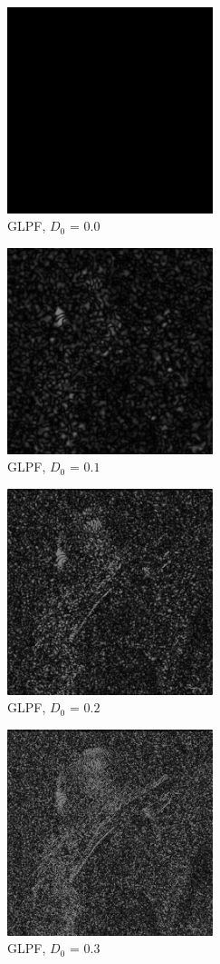 \documentclass[conference]{IEEEtran}
\begin{document}
\begin{figure}[H]
\centerline{\includegraphics[width=6cm]{GLPF0_0.jpg}}
\caption{GLPF, $D_0$ = $0.0$}
\label{GLPF0.0}
\end{figure}

\begin{figure}[H]
\centerline{\includegraphics[width=6cm]{GLPF0_1.jpg}}
\caption{GLPF, $D_0$ = $0.1$}
\label{GLPF0.1}
\end{figure}

\begin{figure}[H]
\centerline{\includegraphics[width=6cm]{GLPF0_2.jpg}}
\caption{GLPF, $D_0$ = $0.2$}
\label{GLPF0.2}
\end{figure}


\begin{figure}[H]
\centerline{\includegraphics[width=6cm]{GLPF0_3.jpg}}
\caption{GLPF, $D_0$ = $0.3$}
\label{GLPF0.3}
\end{figure}
\end{document}
